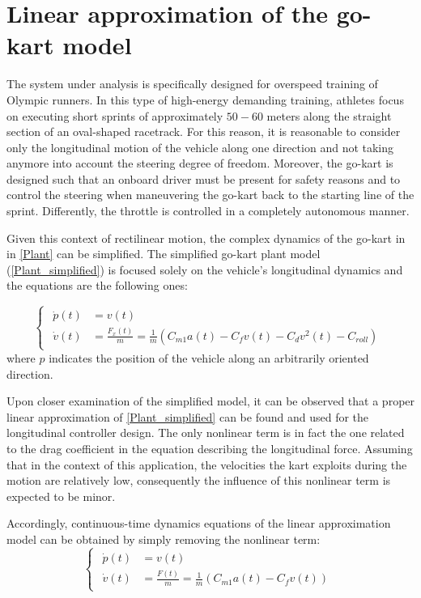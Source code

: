 \documentclass[a4paper,12pt,oneside]{book}
\begin{document}
\section{Linear approximation of the go-kart model}
The system under analysis is specifically designed for overspeed training of Olympic runners.
In this type of high-energy demanding training, athletes focus on executing short sprints of approximately $50-60$ meters along the straight section of an oval-shaped racetrack.
For this reason, it is reasonable to consider only the longitudinal motion of the vehicle along one direction and not taking anymore into account the steering degree of freedom. 
Moreover, the go-kart is designed such that an onboard driver must be present for safety reasons and to control the steering when maneuvering the go-kart back to the starting line of the sprint.
Differently, the throttle is controlled in a completely autonomous manner.

\bigskip
Given this context of rectilinear motion, the complex dynamics of the go-kart in in \eqref{Plant} can be simplified. 
The simplified go-kart plant model (\ref{Plant_simplified}) is focused solely on the vehicle's longitudinal dynamics and the equations are the following ones:

\begin{equation}
\begin{cases}
 	\begin{aligned}
		\dot{p}(t) &= v(t) \\
		\dot{v}(t) &= \frac{F_x(t)}{m} = \frac{1}{m} (C_{m1} a(t) - C_f v(t) - C_d v^2(t) - C_{roll} )
	\end{aligned}
\end{cases}
\label{Plant_simplified}
\end{equation}
where $p$ indicates the position of the vehicle along an arbitrarily oriented direction.

\bigskip
Upon closer examination of the simplified model, it can be observed that a proper linear approximation of \eqref{Plant_simplified} can be found and used for the longitudinal controller design. 
The only nonlinear term is in fact the one related to the drag coefficient in the equation describing the longitudinal force.
Assuming that in the context of this application, the velocities the kart exploits during the motion are relatively low, consequently the influence of this nonlinear term is expected to be minor.

Accordingly, continuous-time dynamics equations of the linear approximation model can be obtained by simply removing the nonlinear term:
\begin{equation}
\begin{cases}
 	\begin{aligned}
		\dot{p}(t) &= v(t) \\
		\dot{v}(t) &= \frac{F(t)}{m} = \frac{1}{m} (C_{m1} a(t) - C_f v(t) )
	\end{aligned}
\end{cases}
\label{CT_Linear_dynamics}
\end{equation}
\end{document}

